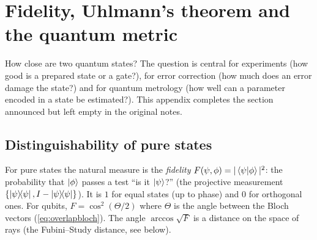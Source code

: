 \chapter{Fidelity, Uhlmann's theorem and the quantum metric}\label{app:fidelity}

How close are two quantum states? The question is central for experiments (how good is a prepared state or a gate?), for error correction (how much does an error damage the state?) and for quantum metrology
(how well can a parameter encoded in a state be estimated?). This appendix completes the section announced but left empty in the original notes.

\section{Distinguishability of pure states}
For pure states the natural measure is the \emph{fidelity} $F(\psi,\phi)=|\left\langle\psi\middle|\phi\right\rangle|^2$: the probability that $\left|\phi\right\rangle$ passes a test ``is it $\left|\psi\right\rangle$?'' (the projective measurement $\{\left|\psi\middle\rangle\!\middle\langle\psi\right|,I-\left|\psi\middle\rangle\!\middle\langle\psi\right|\}$). It is $1$ for equal states (up to phase)
and $0$ for orthogonal ones. For qubits, $F=\cos^2(\Theta/2)$ where $\Theta$ is the angle between the Bloch vectors (\cref{eq:overlapbloch}). The angle $\arccos\sqrt F$ is a distance on the space of rays (the Fubini--Study distance, see below).

